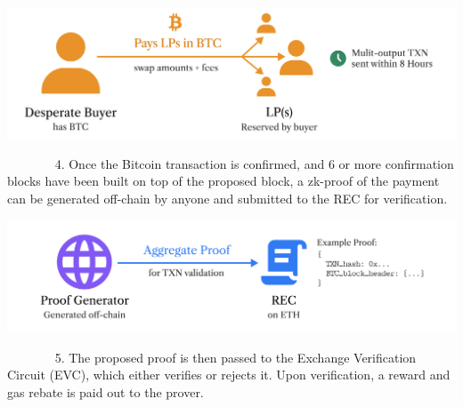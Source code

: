 \documentclass[
]{article}
\begin{document}
{}

{}
{}\vspace*{\baselineskip}
\begin{center}
{\includegraphics{images/image1.png}}
\end{center}
{}\vspace*{\baselineskip}

{}

{}


{~ ~ ~ ~ ~4. Once the Bitcoin transaction is confirmed, and 6 or more confirmation
  blocks have been built on top of the proposed block, a zk-proof of the payment can be generated
off-chain by anyone and submitted to the REC for verification.}


{}

{}

{}
{}\vspace*{\baselineskip}

{\includegraphics{images/image6.png}}
{}\vspace*{\baselineskip}

{}

{}


{~ ~ ~ ~ ~5. The proposed proof is then passed to the Exchange Verification
  Circuit (EVC), which either verifies or rejects it. Upon verification, a reward and gas rebate is paid out
to the prover.}

{}

{}
{}\vspace*{\baselineskip}

{}\vspace*{\baselineskip}
\end{document}
